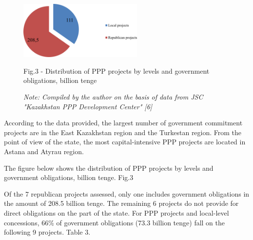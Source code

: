 \begin{figure}[H]
	\centering
	\includegraphics[width=0.55\textwidth]{media/ekon4/image19}
	\caption*{Fig.3 - Distribution of PPP projects by levels and government obligations, billion tenge}
	\caption*{\normalfont\emph{Note: Compiled by the author on the basis of data from JSC "Kazakhstan PPP Development Center" {[}6{]}}}
\end{figure}

\begin{multicols}{2}
According to the data provided, the largest number of government
commitment projects are in the East Kazakhstan region and the Turkestan
region. From the point of view of the state, the most capital-intensive
PPP projects are located in Astana and Atyrau region.

The figure below shows the distribution of PPP projects by levels and
government obligations, billion tenge. Fig.3

Of the 7 republican projects assessed, only one includes government
obligations in the amount of 208.5 billion tenge. The remaining 6
projects do not provide for direct obligations on the part of the state.
For PPP projects and local-level concessions, 66\% of government
obligations (73.3 billion tenge) fall on the following 9 projects. Table
3.
\end{multicols}


